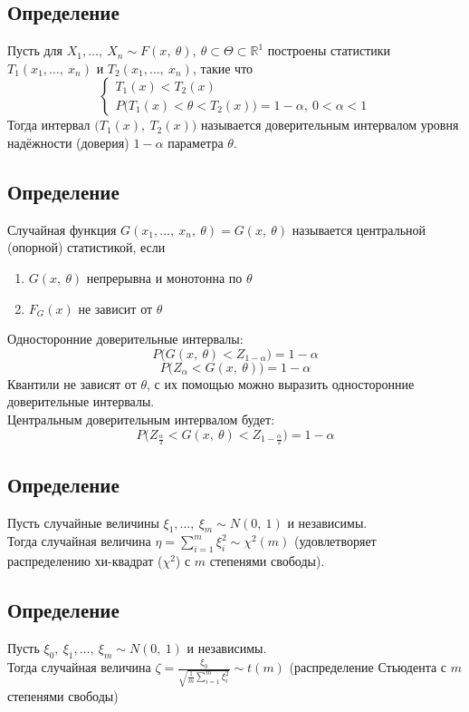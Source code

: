 \documentclass[12pt, a4paper]{article}
\begin{document}
\subsection*{Определение}
Пусть для $X_1,\dots,\ X_n \sim F(x,\ \theta),\ \theta \subset \Theta \subset \mathbb{R}^1$ построены статистики $T_1(x_1,\dots,\ x_n)$ и $T_2(x_1,\dots,\ x_n)$, такие что
\[\begin{cases}
T_1(x) < T_2(x)\\
P\big( T_1(x) < \theta < T_2(x)\big) = 1 - \alpha,\ 0 < \alpha < 1
\end{cases}\]
Тогда интервал $\big( T_1(x),\ T_2(x) \big)$ называется доверительным интервалом уровня надёжности (доверия) $1 - \alpha$ параметра $\theta$.
\subsection*{Определение}
Случайная функция $G(x_1,\dots,\ x_n,\ \theta) = G(x,\ \theta)$ называется центральной (опорной) статистикой, если 
\begin{enumerate}
    \item $G(x,\ \theta)$ непрерывна и монотонна по $\theta$
    \item $F_G(x)$ не зависит от $\theta$
\end{enumerate}
Односторонние доверительные интервалы:
\[P\big( G(x,\ \theta) < Z_{1 - \alpha} \big) = 1 - \alpha\]
\[P\big( Z_{\alpha} < G(x,\ \theta) \big) = 1 - \alpha\]
Квантили не зависят от $\theta$, с их помощью можно выразить односторонние доверительные интервалы.\\
Центральным доверительным интервалом будет:
\[P\big( Z_{\frac{\alpha}{2}} < G(x,\ \theta) < Z_{1 - \frac{\alpha}{2}} \big) = 1 - \alpha\]
\subsection*{Определение}
Пусть случайные величины $\xi_1,\dots,\ \xi_m \sim N(0,\ 1)$ и независимы.\\
Тогда случайная величина $\eta = \sum\limits_{i = 1}^{m} \xi_i^2 \sim \chi^2 (m)$ (удовлетворяет распределению хи-квадрат ($\chi^2$) с $m$ степенями свободы).
\subsection*{Определение}
Пусть $\xi_0,\ \xi_1,\dots,\ \xi_m \sim N(0,\ 1)$ и независимы.\\
Тогда случайная величина $\zeta = \frac{\xi_0}{\sqrt{\frac{1}{m} \sum_{i = 1}^{m} \xi_i^2}} \sim t(m)$ (распределение Стьюдента с $m$ степенями свободы)
\end{document}
